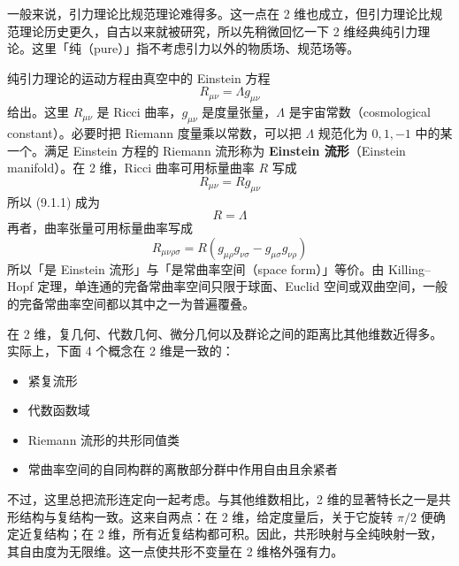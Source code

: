 
一般来说，引力理论比规范理论难得多。这一点在 2 维也成立，但引力理论比规范理论历史更久，自古以来就被研究，所以先稍微回忆一下 2 维经典纯引力理论。这里「纯（pure）」指不考虑引力以外的物质场、规范场等。

纯引力理论的运动方程由真空中的 Einstein 方程
\begin{equation}
  R_{\mu\nu} = \Lambda g_{\mu\nu}
  \tag{9.1.1}
\end{equation}
给出。这里 $R_{\mu\nu}$ 是 Ricci 曲率，$g_{\mu\nu}$ 是度量张量，$\Lambda$ 是宇宙常数（cosmological constant）。必要时把 Riemann 度量乘以常数，可以把 $\Lambda$ 规范化为 $0,1,-1$ 中的某一个。满足 Einstein 方程的 Riemann 流形称为 \textbf{Einstein 流形}（Einstein manifold）。在 2 维，Ricci 曲率可用标量曲率 $R$ 写成
\begin{equation}
  R_{\mu\nu} = R g_{\mu\nu}
  \tag{9.1.2}
\end{equation}
所以 (9.1.1) 成为
\begin{equation}
  R = \Lambda
  \tag{9.1.3}
\end{equation}
再者，曲率张量可用标量曲率写成
\begin{equation}
  R_{\mu\nu\rho\sigma} = R(g_{\mu\rho}g_{\nu\sigma} - g_{\mu\sigma}g_{\nu\rho})
  \tag{9.1.4}
\end{equation}
所以「是 Einstein 流形」与「是常曲率空间（space form）」等价。由 Killing--Hopf 定理，单连通的完备常曲率空间只限于球面、Euclid 空间或双曲空间，一般的完备常曲率空间都以其中之一为普遍覆叠。


在 2 维，复几何、代数几何、微分几何以及群论之间的距离比其他维数近得多。实际上，下面 4 个概念在 2 维是一致的：
\begin{itemize}
  \item 紧复流形
  \item 代数函数域
  \item Riemann 流形的共形同值类
  \item 常曲率空间的自同构群的离散部分群中作用自由且余紧者
\end{itemize}
不过，这里总把流形连定向一起考虑。与其他维数相比，2 维的显著特长之一是共形结构与复结构一致。这来自两点：在 2 维，给定度量后，关于它旋转 $\pi/2$ 便确定近复结构；在 2 维，所有近复结构都可积。因此，共形映射与全纯映射一致，其自由度为无限维。这一点使共形不变量在 2 维格外强有力。

